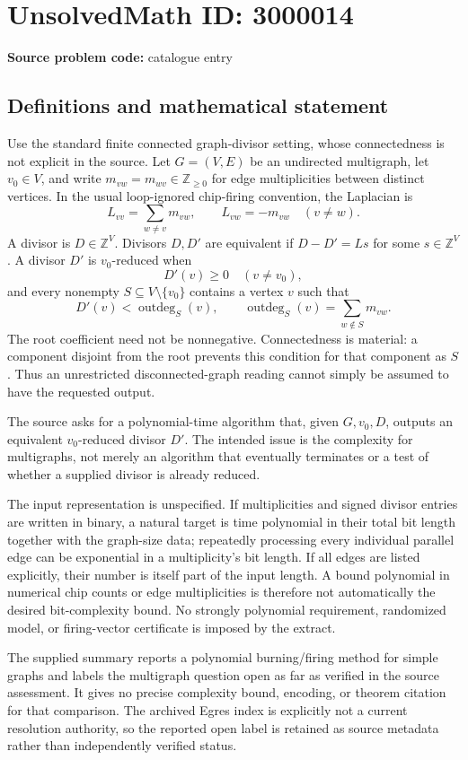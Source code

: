 \documentclass[11pt]{article}
\newcommand{\Z}{\mathbb{Z}}
\begin{document}
\section*{UnsolvedMath ID: 3000014}
\textbf{Source problem code:} catalogue entry
\subsection{Definitions and mathematical statement}
Use the standard finite connected graph-divisor setting, whose connectedness is not explicit in the source. Let $G=(V,E)$ be an undirected multigraph, let $v_0\in V$, and write $m_{vw}=m_{wv}\in\Z_{\ge0}$ for edge multiplicities between distinct vertices. In the usual loop-ignored chip-firing convention, the Laplacian is
\[
L_{vv}=\sum_{w\ne v}m_{vw},\qquad L_{vw}=-m_{vw}\quad(v\ne w).
\]
A divisor is $D\in\Z^V$. Divisors $D,D'$ are equivalent if $D-D'=Ls$ for some $s\in\Z^V$. A divisor $D'$ is $v_0$-reduced when
\[
D'(v)\ge0\quad(v\ne v_0),
\]
and every nonempty $S\subseteq V\setminus\{v_0\}$ contains a vertex $v$ such that
\[
D'(v)<\operatorname{outdeg}_S(v),\qquad
\operatorname{outdeg}_S(v)=\sum_{w\notin S}m_{vw}.
\]
The root coefficient need not be nonnegative. Connectedness is material: a component disjoint from the root prevents this condition for that component as $S$. Thus an unrestricted disconnected-graph reading cannot simply be assumed to have the requested output.

The source asks for a polynomial-time algorithm that, given $G,v_0,D$, outputs an equivalent $v_0$-reduced divisor $D'$. The intended issue is the complexity for multigraphs, not merely an algorithm that eventually terminates or a test of whether a supplied divisor is already reduced.

The input representation is unspecified. If multiplicities and signed divisor entries are written in binary, a natural target is time polynomial in their total bit length together with the graph-size data; repeatedly processing every individual parallel edge can be exponential in a multiplicity's bit length. If all edges are listed explicitly, their number is itself part of the input length. A bound polynomial in numerical chip counts or edge multiplicities is therefore not automatically the desired bit-complexity bound. No strongly polynomial requirement, randomized model, or firing-vector certificate is imposed by the extract.

The supplied summary reports a polynomial burning/firing method for simple graphs and labels the multigraph question open as far as verified in the source assessment. It gives no precise complexity bound, encoding, or theorem citation for that comparison. The archived Egres index is explicitly not a current resolution authority, so the reported open label is retained as source metadata rather than independently verified status.
\end{document}
